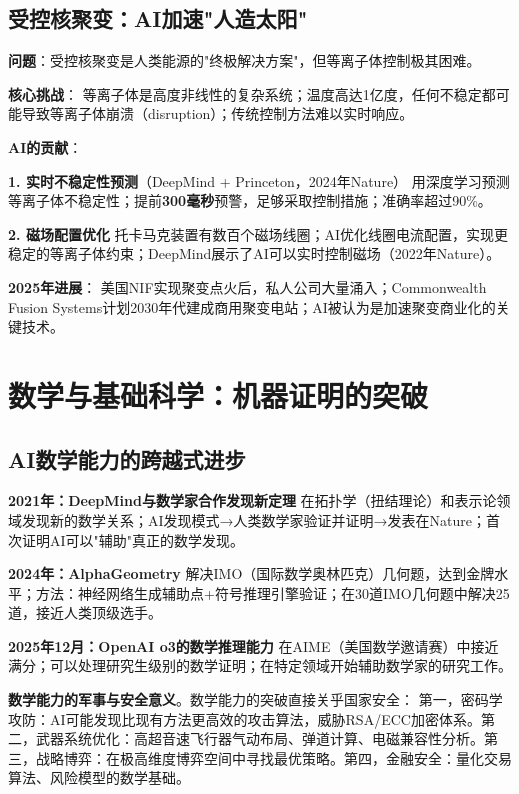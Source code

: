 \subsection{受控核聚变：AI加速"人造太阳"}

\textbf{问题}：受控核聚变是人类能源的"终极解决方案"，但等离子体控制极其困难。

\textbf{核心挑战}：
等离子体是高度非线性的复杂系统；温度高达1亿度，任何不稳定都可能导致等离子体崩溃（disruption）；传统控制方法难以实时响应。

\textbf{AI的贡献}：

\textbf{1. 实时不稳定性预测}（DeepMind + Princeton，2024年Nature）
用深度学习预测等离子体不稳定性；提前\textbf{300毫秒}预警，足够采取控制措施；准确率超过90\%。

\textbf{2. 磁场配置优化}
托卡马克装置有数百个磁场线圈；AI优化线圈电流配置，实现更稳定的等离子体约束；DeepMind展示了AI可以实时控制磁场（2022年Nature）。

\textbf{2025年进展}：
美国NIF实现聚变点火后，私人公司大量涌入；Commonwealth Fusion Systems计划2030年代建成商用聚变电站；AI被认为是加速聚变商业化的关键技术。

\section{数学与基础科学：机器证明的突破}

\subsection{AI数学能力的跨越式进步}

\textbf{2021年：DeepMind与数学家合作发现新定理}\cite{davies2021advancing}
在拓扑学（扭结理论）和表示论领域发现新的数学关系；AI发现模式→人类数学家验证并证明→发表在Nature；首次证明AI可以"辅助"真正的数学发现。

\textbf{2024年：AlphaGeometry}\cite{romera2024mathematical}
解决IMO（国际数学奥林匹克）几何题，达到金牌水平；方法：神经网络生成辅助点+符号推理引擎验证；在30道IMO几何题中解决25道，接近人类顶级选手。

\textbf{2025年12月：OpenAI o3的数学推理能力}
在AIME（美国数学邀请赛）中接近满分；可以处理研究生级别的数学证明；在特定领域开始辅助数学家的研究工作。

\textbf{数学能力的军事与安全意义}。数学能力的突破直接关乎国家安全：
第一，密码学攻防：AI可能发现比现有方法更高效的攻击算法，威胁RSA/ECC加密体系。第二，武器系统优化：高超音速飞行器气动布局、弹道计算、电磁兼容性分析。第三，战略博弈：在极高维度博弈空间中寻找最优策略。第四，金融安全：量化交易算法、风险模型的数学基础。

